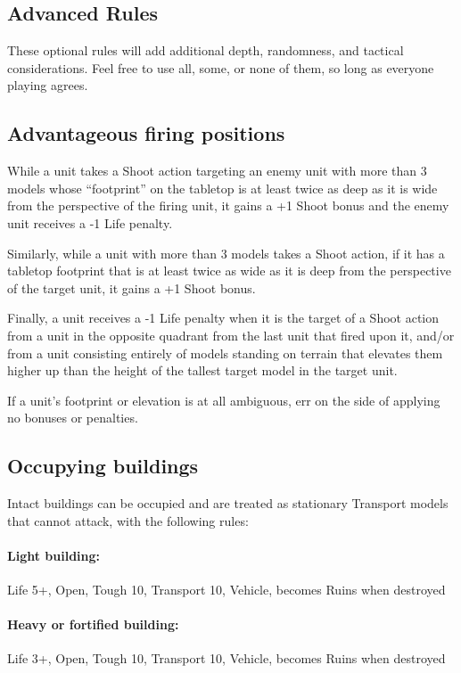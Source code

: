 \begin{multicols}{2}
\chapter*{Advanced Rules}
These optional rules will add additional depth, randomness, and tactical considerations. Feel free to use all, some, or none of them, so long as everyone playing agrees.




\section*{Advantageous firing positions}
While a unit takes a Shoot action targeting an enemy unit with more than 3 models whose ``footprint'' on the tabletop is at least twice as deep as it is wide from the perspective of the firing unit, it gains a +1 Shoot bonus and the enemy unit receives a -1 Life penalty.

Similarly, while a unit with more than 3 models takes a Shoot action, if it has a tabletop footprint that is at least twice as wide as it is deep from the perspective of the target unit, it gains a +1 Shoot bonus.

Finally, a unit receives a -1 Life penalty when it is the target of a Shoot action from a unit in the opposite quadrant from the last unit that fired upon it, and/or from a unit consisting entirely of models standing on terrain that elevates them higher up than the height of the tallest target model in the target unit.

If a unit's footprint or elevation is at all ambiguous, err on the side of applying no bonuses or penalties.




\section*{Occupying buildings}
Intact buildings can be occupied and are treated as stationary Transport models that cannot attack, with the following rules:

\subsubsection*{Light building:} Life 5+, Open, Tough 10, Transport 10, Vehicle, becomes Ruins when destroyed

\subsubsection*{Heavy or fortified building:} Life 3+, Open, Tough 10, Transport 10, Vehicle, becomes Ruins when destroyed


\end{multicols}
